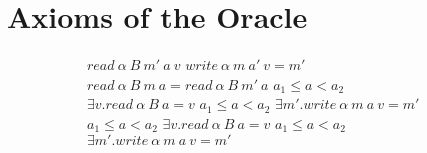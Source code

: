 \documentclass{article}
\begin{document}
\section{Axioms of the Oracle}
\label{sec:axioms}

\begin{figure}
  \begin{subfigure}{0.5\textwidth}
             {\(\mathit{read} ~ \alpha ~ B ~ m' ~ a ~ v\)}
                {\(\mathit{write} ~ \alpha ~ m ~ a' ~ v = m'\)}
                {\(\mathit{read} ~ \alpha ~ B ~ m ~ a =
                  \mathit{read} ~ \alpha ~ B ~ m' ~ a\)}
               {\(a_1 \leq a < a_2\)}
               {\(\exists v . \mathit{read} ~ \alpha ~ B ~ a = v\)}
               {\(a_1 \leq a < a_2\)}
               {\(\exists m' . \mathit{write} ~ \alpha ~ m ~ a ~ v = m'\)}
               {\(a_1 \leq a < a_2\)}
               {\(\exists v . \mathit{read} ~ \alpha ~ B ~ a = v\)}
               {\(a_1 \leq a < a_2\)}
               {\(\exists m' . \mathit{write} ~ \alpha ~ m ~ a ~ v = m'\)}


\end{subfigure}
\end{figure}
\end{document}
